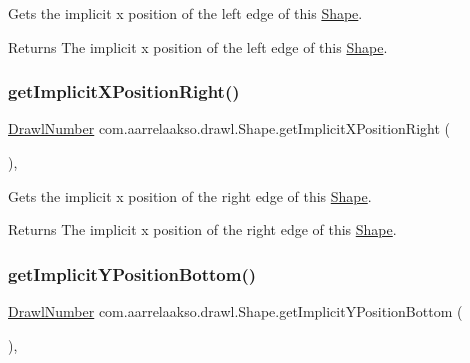 Gets the implicit x position of the left edge of this \hyperlink{classcom_1_1aarrelaakso_1_1drawl_1_1_shape}{Shape}. 

\begin{DoxyReturn}{Returns}
The implicit x position of the left edge of this \hyperlink{classcom_1_1aarrelaakso_1_1drawl_1_1_shape}{Shape}. 
\end{DoxyReturn}
\mbox{\label{classcom_1_1aarrelaakso_1_1drawl_1_1_shape_aedcaf32e6be1114111e5ee2ddb1214a3}} 
\subsubsection{\texorpdfstring{get\+Implicit\+X\+Position\+Right()}{getImplicitXPositionRight()}}
{\footnotesize\ttfamily \hyperlink{classcom_1_1aarrelaakso_1_1drawl_1_1_drawl_number}{Drawl\+Number} com.\+aarrelaakso.\+drawl.\+Shape.\+get\+Implicit\+X\+Position\+Right (\begin{DoxyParamCaption}{ }\end{DoxyParamCaption})\hspace{0.3cm}{\ttfamily [protected]}, {\ttfamily [inherited]}}



Gets the implicit x position of the right edge of this \hyperlink{classcom_1_1aarrelaakso_1_1drawl_1_1_shape}{Shape}. 

\begin{DoxyReturn}{Returns}
The implicit x position of the right edge of this \hyperlink{classcom_1_1aarrelaakso_1_1drawl_1_1_shape}{Shape}. 
\end{DoxyReturn}
\mbox{\label{classcom_1_1aarrelaakso_1_1drawl_1_1_shape_af04961079cb3993d8f73670e6695415b}} 
\subsubsection{\texorpdfstring{get\+Implicit\+Y\+Position\+Bottom()}{getImplicitYPositionBottom()}}
{\footnotesize\ttfamily \hyperlink{classcom_1_1aarrelaakso_1_1drawl_1_1_drawl_number}{Drawl\+Number} com.\+aarrelaakso.\+drawl.\+Shape.\+get\+Implicit\+Y\+Position\+Bottom (\begin{DoxyParamCaption}{ }\end{DoxyParamCaption})\hspace{0.3cm}{\ttfamily [protected]}, {\ttfamily [inherited]}}



